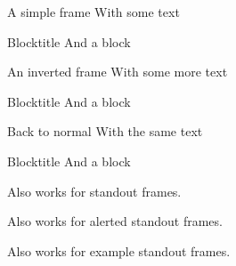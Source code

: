 





\START
\showoutput

\begin{frame}{A simple frame}
  With some text
  \begin{block}{Blocktitle}
    And a block
  \end{block}
\end{frame}

\begin{frame}{An inverted frame}
  With some more text
  \begin{block}{Blocktitle}
    And a block
  \end{block}
\end{frame}

\begin{frame}{Back to normal}
  With the same text
  \begin{block}{Blocktitle}
    And a block
  \end{block}
\end{frame}

\begin{frame}[standout]
  Also works for standout frames.
\end{frame}

\begin{frame}[standout=alerted]
  Also works for alerted standout frames.
\end{frame}

\begin{frame}[standout=example]
  Also works for example standout frames.
\end{frame}


